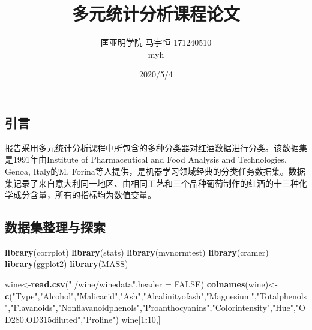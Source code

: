 \documentclass[]{article}
\title{多元统计分析课程论文}
\author{匡亚明学院 马宇恒 171240510 \\ myh}
\date{2020/5/4}
\newenvironment{Shaded}{\begin{snugshade}}{\end{snugshade}}
\newcommand{\DataTypeTok}[1]{\textcolor[rgb]{0.13,0.29,0.53}{#1}}
\newcommand{\DecValTok}[1]{\textcolor[rgb]{0.00,0.00,0.81}{#1}}
\newcommand{\KeywordTok}[1]{\textcolor[rgb]{0.13,0.29,0.53}{\textbf{#1}}}
\newcommand{\NormalTok}[1]{#1}
\newcommand{\OperatorTok}[1]{\textcolor[rgb]{0.81,0.36,0.00}{\textbf{#1}}}
\newcommand{\OtherTok}[1]{\textcolor[rgb]{0.56,0.35,0.01}{#1}}
\newcommand{\StringTok}[1]{\textcolor[rgb]{0.31,0.60,0.02}{#1}}
\begin{document}
\maketitle

\subsection{引言}

报告采用多元统计分析课程中所包含的多种分类器对红酒数据进行分类。该数据集是1991年由Institute
of Pharmaceutical and Food Analysis and Technologies, Genoa, Italy的M.
Forina等人提供，是机器学习领域经典的分类任务数据集。数据集记录了来自意大利同一地区、由相同工艺和三个品种葡萄制作的红酒的十三种化学成分含量，所有的指标均为数值变量。

\subsection{数据集整理与探索}

\begin{Shaded}
\begin{Highlighting}[]
\KeywordTok{library}\NormalTok{(corrplot)}
\KeywordTok{library}\NormalTok{(stats)}
\KeywordTok{library}\NormalTok{(mvnormtest)}
\KeywordTok{library}\NormalTok{(cramer)}
\KeywordTok{library}\NormalTok{(ggplot2)}
\KeywordTok{library}\NormalTok{(MASS)}
\end{Highlighting}
\end{Shaded}

\begin{Shaded}
\begin{Highlighting}[]
\NormalTok{wine<-}\KeywordTok{read.csv}\NormalTok{(}\StringTok{"./wine/winedata"}\NormalTok{,}\DataTypeTok{header =} \OtherTok{FALSE}\NormalTok{)}
\KeywordTok{colnames}\NormalTok{(wine)<-}\KeywordTok{c}\NormalTok{(}\StringTok{"Type"}\NormalTok{,}\StringTok{"Alcohol"}\NormalTok{,}\StringTok{"Malicacid"}\NormalTok{,}\StringTok{"Ash"}\NormalTok{,}\StringTok{"Alcalinityofash"}\NormalTok{,}\StringTok{"Magnesium"}\NormalTok{,}\StringTok{"Totalphenols"}\NormalTok{,}\StringTok{"Flavanoids"}\NormalTok{,}\StringTok{"Nonflavanoidphenols"}\NormalTok{,}\StringTok{"Proanthocyanins"}\NormalTok{,}\StringTok{"Colorintensity"}\NormalTok{,}\StringTok{"Hue"}\NormalTok{,}\StringTok{"OD280.OD315diluted"}\NormalTok{,}\StringTok{"Proline"}\NormalTok{)}
\NormalTok{wine[}\DecValTok{1}\OperatorTok{:}\DecValTok{10}\NormalTok{,]}
\end{Highlighting}
\end{Shaded}
\end{document}
